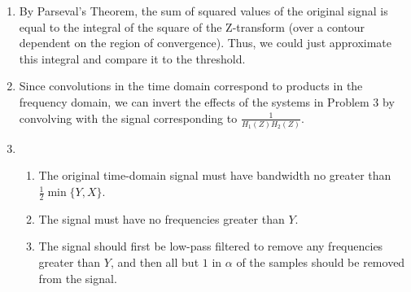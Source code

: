 \documentclass[11pt]{article}
\begin{document}
\begin{enumerate}
\item By Parseval's Theorem, the sum of squared values of the original signal
is equal to the integral of the square of the Z-transform (over a contour
dependent on the region of convergence). Thus, we could just approximate this
integral and compare it to the threshold.

\item Since convolutions in the time domain correspond to products in the
frequency domain, we can invert the effects of the systems in Problem 3 by
convolving with the signal corresponding to $\frac{1}{H_1(Z)H_2(Z)}$.

\item
\begin{enumerate}
\item The original time-domain signal must have bandwidth no greater than
$\frac12\min\{Y,X\}$.

\item The signal must have no frequencies greater than $Y$.

\item The signal should first be low-pass filtered to remove any frequencies
greater than $Y$, and then all but $1$ in $\alpha$ of the samples should be
removed from the signal.

\end{enumerate}

\end{enumerate}
\end{document}
